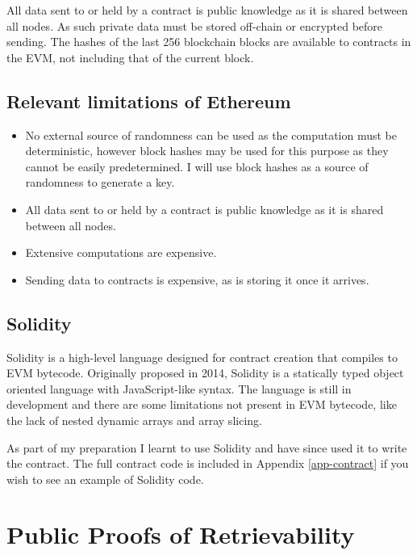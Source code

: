 \documentclass[12pt,a4paper,twoside,openright]{report}
\begin{document}
All data sent to or held by a contract is public knowledge as it is shared between all nodes.
As such private data must be stored off-chain or encrypted before sending.
The hashes of the last 256 blockchain blocks are available to contracts in the EVM, not including that of the current block.

\subsection{Relevant limitations of Ethereum}

\begin{itemize}
\item No external source of randomness can be used as the computation must be deterministic,
however block hashes may be used for this purpose as they cannot be easily predetermined.
I will use block hashes as a source of randomness to generate a key.

\item All data sent to or held by a contract is public knowledge as it is shared between all nodes.

\item Extensive computations are expensive.

\item Sending data to contracts is expensive, as is storing it once it arrives.
\end{itemize}


\subsection{Solidity}

Solidity is a high-level language designed for contract creation that compiles to EVM bytecode.
Originally proposed in 2014, Solidity is a statically typed object oriented language with JavaScript-like syntax\cite{solidity-proposal}.
The language is still in development and there are some limitations not present in EVM bytecode, like the lack of nested dynamic arrays and array slicing\cite{solidity-docs}.

As part of my preparation I learnt to use Solidity and have since used it to write the contract.
The full contract code is included in Appendix \ref{app-contract} if you wish to see an example of Solidity code.


\section{Public Proofs of Retrievability}
\end{document}
